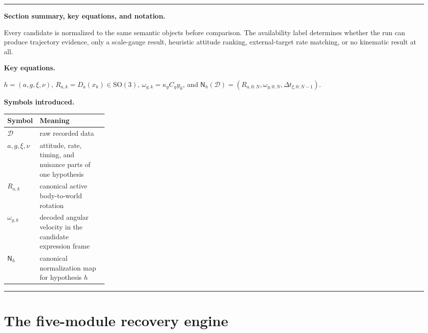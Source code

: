\documentclass[11pt]{article}
\newcommand{\SO}{\mathrm{SO}(3)}
\newenvironment{sectionrecap}
{\par\medskip\begingroup\small\noindent\rule{\linewidth}{0.4pt}\par
\smallskip\noindent\textbf{Section summary, key equations, and notation.}\par\smallskip}
{\par\smallskip\noindent\rule{\linewidth}{0.4pt}\par\endgroup\medskip}
\begin{document}
    \begin{sectionrecap}
        Every candidate is normalized to the same semantic objects before comparison. The
        availability label determines whether the run can produce trajectory evidence, only a
        scale-gauge result, heuristic attitude ranking, external-target rate matching, or no
        kinematic result at all.

        \noindent\textbf{Key equations.}\par
        $h=(a,g,\xi,\nu)$,
        $R_{a,k}=D_a(x_k)\in\SO$,
        $\omega_{g,k}=\kappa_gC_gy_k$, and
        $\mathsf N_h(\mathcal D)=(R_{a,0:N},\omega_{g,0:N},\Delta t_{\xi,0:N-1})$.

        \noindent\textbf{Symbols introduced.}
        \begin{center}
            \small
            \begin{tabularx}{0.96\linewidth}{@{}p{0.24\linewidth}Y@{}}
\toprule
Symbol & Meaning \\
\midrule
$\mathcal D$ & raw recorded data \\
$a,g,\xi,\nu$ & attitude, rate, timing, and nuisance parts of one hypothesis \\
$R_{a,k}$ & canonical active body-to-world rotation \\
$\omega_{g,k}$ & decoded angular velocity in the candidate expression frame \\
$\mathsf N_h$ & canonical normalization map for hypothesis $h$ \\
\bottomrule
            \end{tabularx}
        \end{center}
    \end{sectionrecap}


    \section{The five-module recovery engine}\label{sec:workflow}
\end{document}
